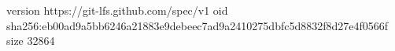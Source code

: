 version https://git-lfs.github.com/spec/v1
oid sha256:eb00ad9a5bb6246a21883e9debeec7ad9a2410275dbfc5d8832f8d27e4f0566f
size 32864
